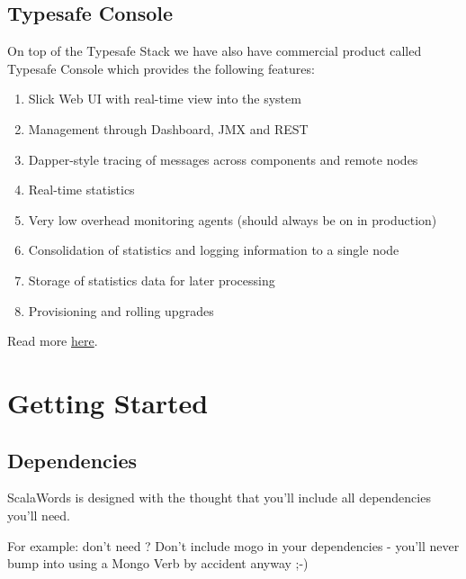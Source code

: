 \documentclass[a4paper,10pt,oneside,openany]{sphinxmanual}
\begin{document}
\subsection{Typesafe Console}
\label{intro/what-is-scala-words:typesafe-console}
On top of the Typesafe Stack we have also have commercial product called Typesafe
Console which provides the following features:
\begin{enumerate}
\item {} 
Slick Web UI with real-time view into the system

\item {} 
Management through Dashboard, JMX and REST

\item {} 
Dapper-style tracing of messages across components and remote nodes

\item {} 
Real-time statistics

\item {} 
Very low overhead monitoring agents (should always be on in production)

\item {} 
Consolidation of statistics and logging information to a single node

\item {} 
Storage of statistics data for later processing

\item {} 
Provisioning and rolling upgrades

\end{enumerate}

Read more \href{http://typesafe.com/products/typesafe-subscription}{here}.


\section{Getting Started}
\label{intro/getting-started:getting-started}\label{intro/getting-started::doc}

\subsection{Dependencies}
\label{intro/getting-started:dependencies}
ScalaWords is designed with the thought that you'll include all dependencies you'll need.

For example: don't need ? Don't include mogo in your dependencies - you'll never bump into using a Mongo Verb by accident anyway ;-)
\end{document}
